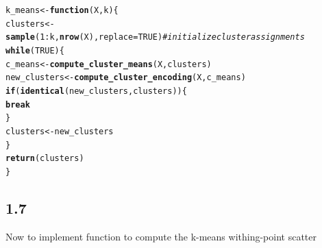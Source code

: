 \documentclass[10pt, a4paper, english]{article}\usepackage[]{graphicx}\usepackage[dvipsnames]{xcolor}
\makeatletter
\newcommand{\hlnum}[1]{\textcolor[rgb]{0.686,0.059,0.569}{#1}}%
\newcommand{\hlcom}[1]{\textcolor[rgb]{0.678,0.584,0.686}{\textit{#1}}}%
\newcommand{\hlopt}[1]{\textcolor[rgb]{0,0,0}{#1}}%
\newcommand{\hlstd}[1]{\textcolor[rgb]{0.345,0.345,0.345}{#1}}%
\newcommand{\hlkwa}[1]{\textcolor[rgb]{0.161,0.373,0.58}{\textbf{#1}}}%
\newcommand{\hlkwb}[1]{\textcolor[rgb]{0.69,0.353,0.396}{#1}}%
\newcommand{\hlkwc}[1]{\textcolor[rgb]{0.333,0.667,0.333}{#1}}%
\newcommand{\hlkwd}[1]{\textcolor[rgb]{0.737,0.353,0.396}{\textbf{#1}}}%
\newenvironment{kframe}{%
 \def\at@end@of@kframe{}%
 \ifinner\ifhmode%
  \def\at@end@of@kframe{\end{minipage}}%
  \begin{minipage}{\columnwidth}%
 \fi\fi%
 \def\FrameCommand##1{\hskip\@totalleftmargin \hskip-\fboxsep
 \colorbox{shadecolor}{##1}\hskip-\fboxsep
     \hskip-\linewidth \hskip-\@totalleftmargin \hskip\columnwidth}%
 \MakeFramed {\advance\hsize-\width
   \@totalleftmargin\z@ \linewidth\hsize
   \@setminipage}}%
 {\par\unskip\endMakeFramed%
 \at@end@of@kframe}
\newenvironment{knitrout}{}{} %
\makeatother
\begin{document}
\begin{knitrout}
\color{fgcolor}\begin{kframe}
\begin{alltt}
\hlstd{k_means} \hlkwb{<-} \hlkwa{function}\hlstd{(}\hlkwc{X}\hlstd{,}\hlkwc{k}\hlstd{)\{}
  \hlstd{clusters} \hlkwb{<-} \hlkwd{sample}\hlstd{(}\hlnum{1}\hlopt{:}\hlstd{k,} \hlkwd{nrow}\hlstd{(X),} \hlkwc{replace}\hlstd{=}\hlnum{TRUE}\hlstd{)} \hlcom{#initialize cluster assignments}
  \hlkwa{while}\hlstd{(}\hlnum{TRUE}\hlstd{)\{}
      \hlstd{c_means} \hlkwb{<-} \hlkwd{compute_cluster_means}\hlstd{(X, clusters)}
    \hlstd{new_clusters} \hlkwb{<-} \hlkwd{compute_cluster_encoding}\hlstd{(X, c_means)}
    \hlkwa{if}\hlstd{(}\hlkwd{identical}\hlstd{(new_clusters, clusters))\{}
      \hlkwa{break}
    \hlstd{\}}
    \hlstd{clusters} \hlkwb{<-} \hlstd{new_clusters}
  \hlstd{\}}
  \hlkwd{return}\hlstd{(clusters)}
\hlstd{\}}
\end{alltt}
\end{kframe}
\end{knitrout}

\subsection{1.7}
Now to implement  function to compute the k-means withing-point scatter
\end{document}
